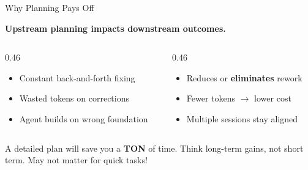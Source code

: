 \documentclass[aspectratio=169, 10pt]{beamer}
\begin{document}
\begin{frame}{Why Planning Pays Off}
\centering
\vskip2pt
\begin{tcolorbox}[accentbox, width=12cm, halign=center, top=3pt, bottom=3pt]
\normalsize\bfseries Upstream planning impacts downstream outcomes.
\end{tcolorbox}
\vskip6pt
\begin{columns}[T]
\begin{column}{0.46\textwidth}
\begin{tcolorbox}[keybox, title={Without a plan}]
\scriptsize
\begin{itemize}\setlength{\itemsep}{1pt}
  \item Constant back-and-forth fixing
  \item Wasted tokens on corrections
  \item Agent builds on wrong foundation
\end{itemize}
\end{tcolorbox}
\end{column}
\begin{column}{0.46\textwidth}
\begin{tcolorbox}[keybox, title={With a detailed plan}]
\scriptsize
\begin{itemize}\setlength{\itemsep}{1pt}
  \item Reduces or \textbf{eliminates} rework
  \item Fewer tokens $\rightarrow$ lower cost
  \item Multiple sessions stay aligned
\end{itemize}
\end{tcolorbox}
\end{column}
\end{columns}
\vskip6pt
\pause
\begin{tcolorbox}[quotebox, width=11cm]
\scriptsize A detailed plan will save you a \textbf{TON} of time. Think long-term gains, not short term. May not matter for quick tasks!
\end{tcolorbox}
\end{frame}
\end{document}
